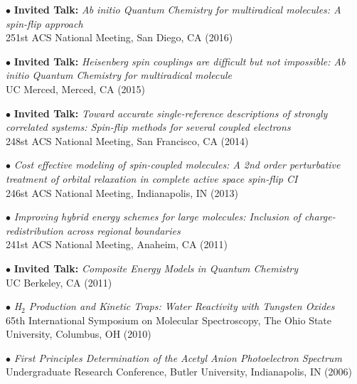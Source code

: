 \documentclass[10pt]{article}
\newenvironment{lonelist}[1][\enskip\textbullet]%
        {\vspace{-\baselineskip}\begin{list}{#1}{%
        \setlength{\partopsep}{0pt}%
        \setlength{\topsep}{0pt}}}
        {\end{list}\vspace{-.6\baselineskip}}
\begin{document}
\begin{lonelist}
\item[$\bullet$] \textbf{Invited Talk:} \textit{Ab initio Quantum Chemistry for multiradical molecules: A spin-flip approach}\\
251st ACS National Meeting, San Diego, CA (2016)

\item[$\bullet$] \textbf{Invited Talk:} \textit{Heisenberg spin couplings are difficult but not impossible: Ab initio Quantum Chemistry for multiradical molecule}\\
UC Merced, Merced, CA (2015)

\item[$\bullet$] \textbf{Invited Talk:} \textit{Toward accurate single-reference descriptions of strongly correlated systems: Spin-flip methods for several coupled electrons}\\
248st ACS National Meeting, San Francisco, CA (2014)

\item[$\bullet$] \textit{Cost effective modeling of spin-coupled molecules: A 2nd order perturbative treatment of orbital relaxation in complete active space spin-flip CI}\\
246st ACS National Meeting, Indianapolis, IN (2013)

\item[$\bullet$] \textit{Improving hybrid energy schemes for large molecules: Inclusion of charge-redistribution across regional boundaries}\\
241st ACS National Meeting, Anaheim, CA (2011)

\item[$\bullet$] \textbf{Invited Talk:} \textit{Composite Energy Models in Quantum Chemistry} \\
UC Berkeley, CA (2011)

\item[$\bullet$] \textit{H$_2$ Production and Kinetic Traps: Water Reactivity with Tungsten Oxides}\\
65th International Symposium on Molecular Spectroscopy, The Ohio State University, Columbus, OH (2010)

\item[$\bullet$] \textit{First Principles Determination of the Acetyl Anion Photoelectron Spectrum}\\
Undergraduate Research Conference, Butler University, Indianapolis, IN (2006)\\\\
\end{lonelist}
\end{document}
